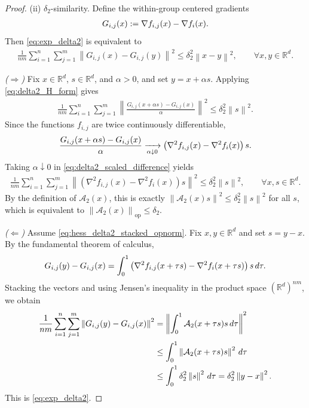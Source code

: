 \documentclass[10pt,a4paper]{amsart}
\newcommand{\R}{\bb R}
\newcommand{\bb}{\mathbb}
\newcommand{\eqdef}{:=}
\newcommand{\op}{\operatorname{op}}
\newcommand{\opnorm}[1]{\left\| #1 \right\|_{\op}}      %
\providecommand{\paragraph}{}
\newcommand{\rb}[1]{\left(#1\right)}
\newcommand{\sqn}[1]{\left\| #1 \right\|^2}
\begin{document}
\begin{proof}
\paragraph{(ii) $\delta_2$-similarity.}
Define the within-group centered gradients
\begin{align}
    G_{i,j}(x)\eqdef \nabla f_{i,j}(x)-\nabla f_i(x).
    \notag
\end{align}
Then \eqref{eq:exp_delta2} is equivalent to
\begin{align}
    \frac1{nm}\sum_{i=1}^n\sum_{j=1}^m
    \sqn{G_{i,j}(x)-G_{i,j}(y)}
    \le
    \delta_2^2\sqn{x-y},
    \qquad
    \forall x,y\in\R^d .
    \label{eq:delta2_H_form}
\end{align}

\smallskip
\noindent
\emph{($\Rightarrow$)}
Fix $x\in\R^d$, $s\in\R^d$, and $\alpha>0$, and set
$y=x+\alpha s$. Applying \eqref{eq:delta2_H_form} gives
\begin{align}
    \frac1{nm}\sum_{i=1}^n\sum_{j=1}^m
    \sqn{
    \frac{G_{i,j}(x+\alpha s)-G_{i,j}(x)}{\alpha}}
    \le
    \delta_2^2\sqn{s}.
    \label{eq:delta2_scaled_difference}
\end{align}
Since the functions $f_{i,j}$ are twice continuously differentiable,
\begin{align}
    \frac{G_{i,j}(x+\alpha s)-G_{i,j}(x)}{\alpha}
    \xrightarrow[\alpha\downarrow 0]{}
    \rb{\nabla^2 f_{i,j}(x)-\nabla^2 f_i(x)}s .
    \notag
\end{align}
Taking $\alpha\downarrow 0$ in \eqref{eq:delta2_scaled_difference} yields
\begin{align}
    \frac1{nm}\sum_{i=1}^n\sum_{j=1}^m
    \sqn{
    \rb{\nabla^2 f_{i,j}(x)-\nabla^2 f_i(x)}s}
    \le
    \delta_2^2\sqn{s},
    \qquad
    \forall x,s\in\R^d .
    \label{eq:delta2_directional_hessian}
\end{align}
By the definition of $\mathcal{A}_2(x)$, this is exactly
$\sqn{\mathcal{A}_2(x)s}\le \delta_2^2\sqn{s}$ for all $s$,
which is equivalent to $\opnorm{\mathcal{A}_2(x)}\le \delta_2$.

\smallskip
\noindent
\emph{($\Leftarrow$)}
Assume \eqref{eq:hess_delta2_stacked_opnorm}. Fix $x,y\in\R^d$
and set $s=y-x$. By the fundamental theorem of calculus,
\begin{align}
    G_{i,j}(y)-G_{i,j}(x)
    =
    \int_0^1
    \rb{\nabla^2 f_{i,j}(x+\tau s)-\nabla^2 f_i(x+\tau s)}s
    \,d\tau .
    \notag
\end{align}
Stacking the vectors and using Jensen's inequality in the product space
$(\R^d)^{nm}$, we obtain
\begin{align}
    \frac1{nm}\sum_{i=1}^n\sum_{j=1}^m
    \sqn{G_{i,j}(y)-G_{i,j}(x)}
    &=
    \sqn{
    \int_0^1
    \mathcal{A}_2(x+\tau s)s
    \,d\tau}
    \notag
    \\
    &\le
    \int_0^1
    \sqn{\mathcal{A}_2(x+\tau s)s}
    \,d\tau
    \notag
    \\
    &\le
    \int_0^1
    \delta_2^2\sqn{s}
    \,d\tau
    =
    \delta_2^2\sqn{y-x}.
    \notag
\end{align}
This is \eqref{eq:exp_delta2}.
\end{proof}
\end{document}
